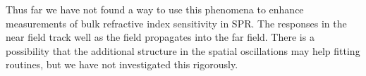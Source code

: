 Thus far we have not found a way to use this phenomena to enhance
measurements of bulk refractive index sensitivity in SPR.  The responses in
the near field track well as the field propagates into the far field.
There is a possibility that the additional structure in the spatial
oscillations may help fitting routines, but we have not investigated this
rigorously.

